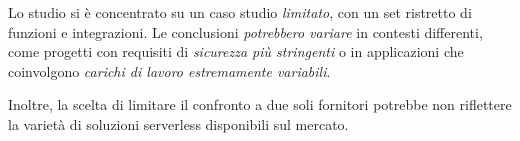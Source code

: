Lo studio si è concentrato su un caso studio \textit{limitato}, con un set ristretto di funzioni e integrazioni. Le conclusioni \textit{potrebbero variare} in contesti differenti, come progetti con requisiti di \textit{sicurezza più stringenti} o in applicazioni che coinvolgono \textit{carichi di lavoro estremamente variabili}. 

Inoltre, la scelta di limitare il confronto a due soli fornitori potrebbe non riflettere la varietà di soluzioni serverless disponibili sul mercato.